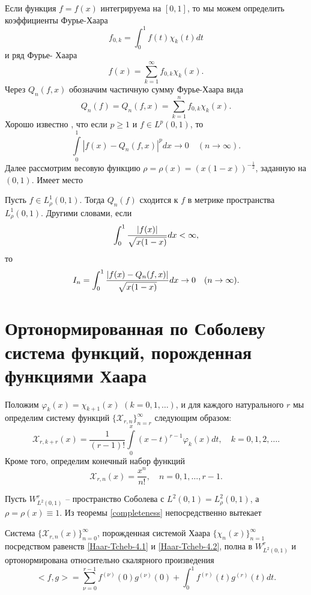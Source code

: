 Если функция $f=f(x)$ интегрируема на $[0,1]$, то мы можем определить коэффициенты Фурье-Хаара
\begin{equation}\label{Haar-Tcheb-eq3.3}
f_{0,k}=\int_0^1f(t)\chi_k(t)dt
\end{equation}
 и ряд Фурье- Хаара
\begin{equation}\label{Haar-Tcheb-eq3.4}
f(x)=\sum_{k=1}^\infty f_{0,k}\chi_k(x).
\end{equation}
Через $Q_n(f,x)$ обозначим частичную сумму  Фурье-Хаара вида
\begin{equation}\label{Haar-Tcheb-eq3.5}
Q_n(f)=Q_n(f,x)=\sum_{k=1}^n f_{0,k}\chi_k(x).
\end{equation}
Хорошо известно \cite{Haar-Tcheb-KashSaak}, что если $p\ge1$ и  $f\in L^p(0,1)$, то
\begin{equation}\label{Haar-Tcheb-eq3.6}
\int\limits_0^1|f(x)-Q_n(f,x)|^pdx\to 0 \quad(n\to\infty).
\end{equation}
Далее рассмотрим весовую функцию $\rho=\rho(x)=(x(1-x))^{-\frac12}$, заданную на $(0,1)$.  Имеет место
\begin{lemma}\label{haar-series-conv}
Пусть $f\in L^1_\rho(0,1)$. Тогда $Q_n(f)$ сходится к $f$ в метрике пространства $L^1_\rho(0,1)$.  Другими словами, если $$\int_0^1{|f(x)|\over\sqrt{x(1-x)}}dx<\infty,$$
то
\begin{equation}\label{Haar-Tcheb-eq3.7}
I_n=\int_0^1{|f(x)-Q_n(f,x)|\over\sqrt{x(1-x)}}dx\to 0 \quad(n\to\infty).
\end{equation}
\end{lemma}

\section{Ортонормированная по Соболеву система функций, порожденная функциями   Хаара}
Положим $\varphi_k(x)=\chi_{k+1}(x)$ $(k=0,1,\ldots)$, и для каждого натурального $r$ мы определим систему функций $\{\mathcal{X}_{r,n}\}_{n=r}^\infty$ следующим образом:
\begin{equation}\label{Haar-Tcheb-4.1}
\mathcal{X}_{r,k+r}(x) =\frac{1}{(r-1)!}\int\limits_0^x(x-t)^{r-1}\varphi_k(x)dt, \quad k=0,1, 2, \ldots.
\end{equation}
 Кроме того, определим конечный набор функций
  \begin{equation}\label{Haar-Tcheb-4.2}
\mathcal{X}_{r,n}(x) =\frac{x^n}{n!}, \quad n=0,1,\ldots, r-1.
\end{equation}

   Пусть $W^r_{L^2(0,1)}$ --  пространство Соболева с  $L^2(0,1)=L^2_\rho(0,1)$, а $\rho=\rho(x) \equiv 1$. Из теоремы \ref{completeness} непосредственно вытекает
 \begin{corollary}
   Система $\{\mathcal{X}_{r,n}(x)\}_{n=0}^\infty$, порожденная системой Хаара $\{\chi_{n}(x)\}_{n=1}^\infty$ посредством равенств \eqref{Haar-Tcheb-4.1} и \eqref{Haar-Tcheb-4.2}, полна  в $W^r_{L^2(0,1)}$ и ортонормирована относительно скалярного произведения
 \begin{equation}\label{Haar-Tcheb-4.3}
<f,g>=\sum_{\nu=0}^{r-1}f^{(\nu)}(0)g^{(\nu)}(0)+\int_{0}^{1} f^{(r)}(t)g^{(r)}(t) dt.
\end{equation}
 \end{corollary}

